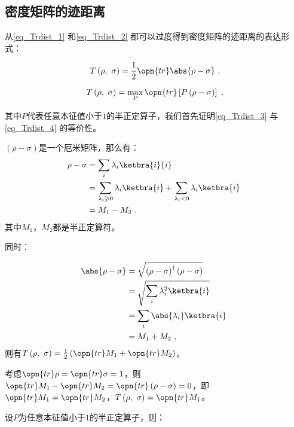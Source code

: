\subsection{密度矩阵的迹距离}

从\autoref{eq_Trdist_1} 和\autoref{eq_Trdist_2} 都可以过度得到密度矩阵的迹距离的表达形式：

\begin{equation}\label{eq_Trdist_4}
T\left(\rho,~\sigma\right) = \frac{1}{2} \opn{tr}\abs{\rho - \sigma}~.
\end{equation}

\begin{equation}\label{eq_Trdist_3}
T\left(\rho,~\sigma\right) = \max_{ P } \opn{tr}\left[P\left(\rho - \sigma\right)\right]~.
\end{equation}

其中$P$代表任意本征值小于$1$的半正定算子，我们首先证明\autoref{eq_Trdist_3} 与\autoref{eq_Trdist_4} 的等价性。

$\left(\rho - \sigma\right)$是一个厄米矩阵，那么有：
\begin{equation}
\begin{aligned}
\rho - \sigma &= \sum_i \lambda_i \ketbra{i}{i} \\
&= \sum_{\lambda_i \geqslant 0}\lambda_i \ketbra{i} + \sum_{\lambda_i<0}\lambda_i\ketbra{i} \\
&= M_1 - M_2~.
\end{aligned}~
\end{equation}
其中$M_1$，$M_2$都是半正定算符。

同时：

\begin{equation}
\begin{aligned}
\abs{\rho - \sigma} &= \sqrt{\left( \rho - \sigma \right)^\dagger \left( \rho - \sigma \right)} \\
&= \sqrt{\sum_i \lambda_i^2\ketbra{i}} \\
&= \sum_i\abs{\lambda_i}\ketbra{i} \\
&= M_1 + M_2~,
\end{aligned}~
\end{equation}
则有$T\left(\rho,~\sigma\right) = \frac{1}{2}\left(\opn{tr}M_1 + \opn{tr}M_2\right)$。

考虑$\opn{tr}\rho = \opn{tr}\sigma = 1$，则$\opn{tr}M_1 - \opn{tr}M_2 = \opn{tr}\left(\rho - \sigma\right) = 0$，即$\opn{tr}M_1 = \opn{tr}M_2$，$T\left(\rho,~\sigma\right) = \opn{tr}M_1$。

设$P$为任意本征值小于$1$的半正定算子，则：

